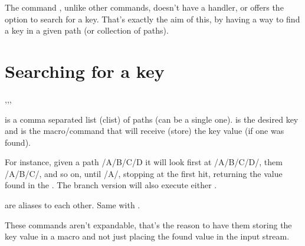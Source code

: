 \documentclass[10pt]{article}
\begin{document}
  
\begin{typesetabstract}

The command \tsobj{\pgfkeysvalueof}, unlike other \tsobj{\pgfkeys} commands, doesn't have a  handler, or offers the option to search for a key.
That's exactly the aim of this, by having a way to find a key in a given path (or collection of paths).
\end{typesetabstract}


\section{Searching for a key}
\begin{codedescribe}[code,update=2024/01/11]{\pgfkeysearchvalueof,\pgfkeysearch,\pgfkeysearchvalueofTF,\pgfkeysearchTF}
\begin{codesyntax}%
\end{codesyntax}
 is a comma separated list (clist) of paths (can be a single one).  is the desired key and  is the macro/command that will receive (store) the key value (if one was found).

For instance, given a path /A/B/C/D it will look first at /A/B/C/D/, them /A/B/C/, and so on, until /A/,
stopping at the first hit, returning the value found in the .
The branch version will also execute either .
  
\end{codedescribe}
\begin{tsremark}
  \tsobj{\pgfkeysearch,\pgfkeysearchvalueof} are aliases to each other. Same with \tsobj{\pgfkeysearchvalueofTF,\pgfkeysearchTF}.
\end{tsremark}
\begin{tsremark}
  These commands aren't expandable, that's the reason to have them storing the key value in a macro and not just placing the found value in the input stream.
\end{tsremark}
\end{document}
